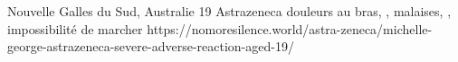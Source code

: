           {Nouvelle Galles du Sud, Australie}
          {19 }
          {Astrazeneca}
          {}
          {douleurs au bras, , malaises, , impossibilité de marcher}
          {https://nomoresilence.world/astra-zeneca/michelle-george-astrazeneca-severe-adverse-reaction-aged-19/}
